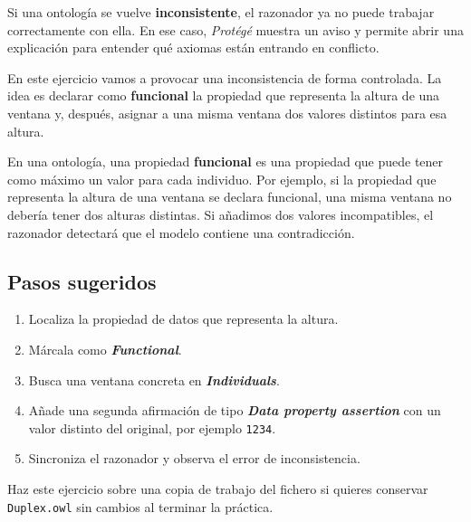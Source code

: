 \documentclass[
  spanish,
  11pt,
  a4paper,
  DIV=11,
  numbers=noendperiod]{scrartcl}
\providecommand{\tightlist}{\setlength{\itemsep}{0pt}\setlength{\parskip}{0pt}}
\begin{document}
Si una ontología se vuelve \textbf{inconsistente}, el razonador ya no
puede trabajar correctamente con ella. En ese caso, \emph{Protégé}
muestra un aviso y permite abrir una explicación para entender qué
axiomas están entrando en conflicto.

En este ejercicio vamos a provocar una inconsistencia de forma
controlada. La idea es declarar como \textbf{funcional} la propiedad que
representa la altura de una ventana y, después, asignar a una misma
ventana dos valores distintos para esa altura.

En una ontología, una propiedad \textbf{funcional} es una propiedad que
puede tener como máximo un valor para cada individuo. Por ejemplo, si la
propiedad que representa la altura de una ventana se declara funcional,
una misma ventana no debería tener dos alturas distintas. Si añadimos
dos valores incompatibles, el razonador detectará que el modelo contiene
una contradicción.


\subsection{Pasos sugeridos}\label{pasos-sugeridos}

\begin{enumerate}
\def\labelenumi{\arabic{enumi}.}
\tightlist
\item
  Localiza la propiedad de datos que representa la altura.
\item
  Márcala como \textbf{\emph{Functional}}.
\item
  Busca una ventana concreta en \textbf{\emph{Individuals}}.
\item
  Añade una segunda afirmación de tipo \textbf{\emph{Data property
  assertion}} con un valor distinto del original, por ejemplo
  \texttt{1234}.
\item
  Sincroniza el razonador y observa el error de inconsistencia.
\end{enumerate}

\begin{tcolorbox}[enhanced jigsaw, leftrule=.75mm, breakable, colback=white, colbacktitle=quarto-callout-warning-color!10!white, bottomrule=.15mm, left=2mm, bottomtitle=1mm, coltitle=black, toprule=.15mm, toptitle=1mm, rightrule=.15mm, opacityback=0, title=\textcolor{quarto-callout-warning-color}{\faExclamationTriangle}\hspace{0.5em}{Recomendación}, arc=.35mm, titlerule=0mm, colframe=quarto-callout-warning-color-frame, opacitybacktitle=0.6]

Haz este ejercicio sobre una copia de trabajo del fichero si quieres
conservar \texttt{Duplex.owl} sin cambios al terminar la práctica.

\end{tcolorbox}
\end{document}
